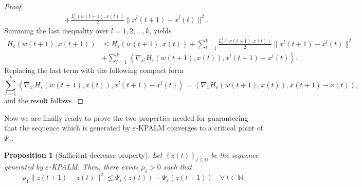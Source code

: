 \documentclass[11pt]{article}
\numberwithin{equation}{section}
\newtheorem{proposition}{Proposition}[section]
\begin{document}
\begin{proof}
\begin{align*}
	&+ \frac{L^l_{\varepsilon}(w(t+1),x(t))}{2} \|x^l(t+1)-x^l(t)\|^2 .  
\end{align*}
Summing the last inequality over $l=1,2, \ldots, k$, yields
\begin{align*}
	H_{\varepsilon}(w(t+1),x(t+1)) 
	&\leq H_{\varepsilon}(w(t+1),x(t)) + \sum\limits_{l=1}^{k} \frac{L^l_{\varepsilon}(w(t+1),x(t))}{2} \|x^l(t+1)-x^l(t)\|^2 \\
	&+ \sum\limits_{l=1}^{k} \left\langle \nabla_{x^l} H_{\varepsilon}(w(t+1),x(t)), x^l(t+1)-x^l(t) \right\rangle   .
\end{align*}
Replacing the last term with the following compact form
\begin{equation*}
	\sum\limits_{l=1}^{k} \left\langle \nabla_{x^l} H_{\varepsilon}(w(t+1),x(t)), x^l(t+1)-x^l(t) \right\rangle  = \left\langle \nabla_x H_{\varepsilon}(w(t+1),x(t)), x(t+1)-x(t) \right\rangle ,
\end{equation*}
and the result follows.
\end{proof}

Now we are finally ready to prove the two properties needed for guaranteeing that the sequence which is generated by $\varepsilon$-KPALM converges to a critical point of $\Psi_{\varepsilon}$.

\begin{proposition}[Sufficient decrease property]
Let $\left\lbrace z(t) \right\rbrace_{t \in \mathbb{N}}$ be the sequence generated by $\varepsilon$-KPALM. Then, there exists $\rho_1 > 0$ such that 
\begin{equation*}
	\rho_1 \|z(t+1) - z(t)\|^2 \leq \Psi_{\varepsilon}(z(t)) - \Psi_{\varepsilon}(z(t+1)) \quad \forall \: t \in \mathbb{N} .
\end{equation*}
\end{proposition}
\end{document}
